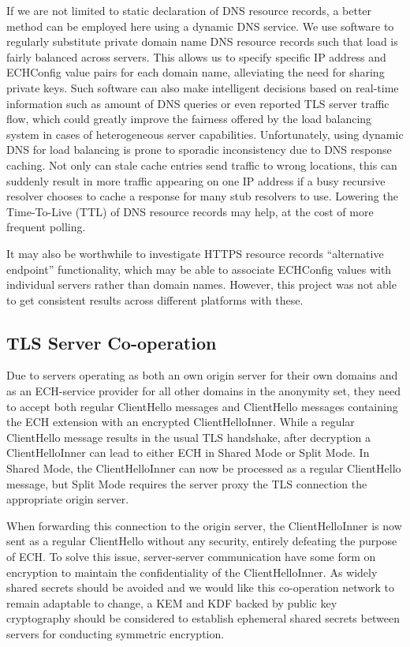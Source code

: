 If we are not limited to static declaration of DNS resource records, a better method can be employed here using a dynamic DNS service. We use software to regularly substitute private domain name DNS resource records such that load is fairly balanced across servers. This allows us to specify specific IP address and ECHConfig value pairs for each domain name, alleviating the need for sharing private keys. Such software can also make intelligent decisions based on real-time information such as amount of DNS queries or even reported TLS server traffic flow, which could greatly improve the fairness offered by the load balancing system in cases of heterogeneous server capabilities. Unfortunately, using dynamic DNS for load balancing is prone to sporadic inconsistency due to DNS response caching. Not only can stale cache entries send traffic to wrong locations, this can suddenly result in more traffic appearing on one IP address if a busy recursive resolver chooses to cache a response for many stub resolvers to use. Lowering the Time-To-Live (TTL) of DNS resource records may help, at the cost of more frequent polling.

It may also be worthwhile to investigate HTTPS resource records ``alternative endpoint'' functionality, which may be able to associate ECHConfig values with individual servers rather than domain names. However, this project was not able to get consistent results across different platforms with these.

\subsection{TLS Server Co-operation}

Due to servers operating as both an own origin server for their own domains and as an ECH-service provider for all other domains in the anonymity set, they need to accept both regular ClientHello messages and ClientHello messages containing the ECH extension with an encrypted ClientHelloInner. While a regular ClientHello message results in the usual TLS handshake, after decryption a ClientHelloInner can lead to either ECH in Shared Mode or Split Mode. In Shared Mode, the ClientHelloInner can now be processed as a regular ClientHello message, but Split Mode requires the server proxy the TLS connection the appropriate origin server.

When forwarding this connection to the origin server, the ClientHelloInner is now sent as a regular ClientHello without any security, entirely defeating the purpose of ECH. To solve this issue, server-server communication have some form on encryption to maintain the confidentiality of the ClientHelloInner. As widely shared secrets should be avoided and we would like this co-operation network to remain adaptable to change, a KEM and KDF backed by public key cryptography should be considered to establish ephemeral shared secrets between servers for conducting symmetric encryption.






